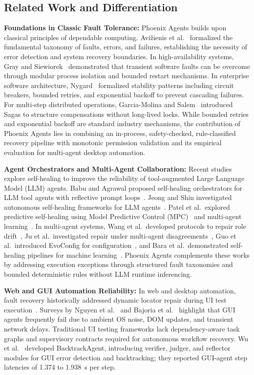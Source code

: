 \documentclass[conference]{IEEEtran}
\begin{document}
\subsection{Related Work and Differentiation}
\textbf{Foundations in Classic Fault Tolerance:} Phoenix Agents builds upon classical principles of dependable computing. Avi\v{z}ienis et al.~\cite{avizienis2004} formalized the fundamental taxonomy of faults, errors, and failures, establishing the necessity of error detection and system recovery boundaries. In high-availability systems, Gray and Siewiorek~\cite{gray1991} demonstrated that transient software faults can be overcome through modular process isolation and bounded restart mechanisms. In enterprise software architecture, Nygard~\cite{nygard2018} formalized stability patterns including circuit breakers, bounded retries, and exponential backoff to prevent cascading failures. For multi-step distributed operations, Garcia-Molina and Salem~\cite{garciamolina1987} introduced Sagas to structure compensations without long-lived locks. While bounded retries and exponential backoff are standard industry mechanisms, the contribution of Phoenix Agents lies in combining an in-process, safety-checked, rule-classified recovery pipeline with monotonic permission validation and its empirical evaluation for multi-agent desktop automation.

\textbf{Agent Orchestrators and Multi-Agent Collaboration:} Recent studies explore self-healing to improve the reliability of tool-augmented Large Language Model (LLM) agents. Babu and Agrawal proposed self-healing orchestrators for LLM tool agents with reflective prompt loops~\cite{babu2026}. Jeong and Shin investigated autonomous self-healing frameworks for LLM agents~\cite{jeong2026}. Patel et al.\ explored predictive self-healing using Model Predictive Control (MPC)~\cite{patel2026a} and multi-agent learning~\cite{patel2026b}. In multi-agent systems, Wang et al.\ developed protocols to repair role drift~\cite{wang2026}, Ju et al.\ investigated repair under multi-agent disagreements~\cite{ju2025}, Guo et al.\ introduced EvoConfig for configuration~\cite{guo2026}, and Bara et al.\ demonstrated self-healing pipelines for machine learning~\cite{bara2026}. Phoenix Agents complements these works by addressing execution exceptions through structured fault taxonomies and bounded deterministic rules without LLM runtime inferencing.

\textbf{Web and GUI Automation Reliability:} In web and desktop automation, fault recovery historically addressed dynamic locator repair during UI test execution~\cite{garcia2026}. Surveys by Nguyen et al.~\cite{nguyen2025} and Bajoria et al.~\cite{bajoria2026} highlight that GUI agents frequently fail due to ambient OS noise, DOM updates, and transient network delays. Traditional UI testing frameworks lack dependency-aware task graphs and supervisory contracts required for autonomous workflow recovery. Wu et al.~\cite{wu2025} developed BacktrackAgent, introducing verifier, judger, and reflector modules for GUI error detection and backtracking; they reported GUI-agent step latencies of 1.374 to 1.938~s per step.
\end{document}
